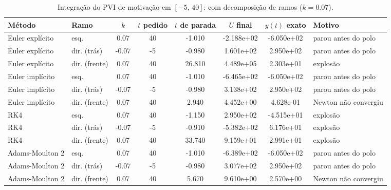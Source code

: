 \begin{table}[H]
    \centering
    \small
    \begin{tabular}{llcccccl}
        \hline
        Método & Ramo & $k$ & $t$ pedido & $t$ de parada & $U$ final & $y(t)$ exato & Motivo \\
        \hline
        Euler explícito & esq. & 0.07 & 40 & -1.010 & -2.188e+02 & -6.050e+02 & parou antes do polo \\
        Euler explícito & dir. (trás) & -0.07 & -5 & -0.980 & 1.601e+02 & 2.950e+02 & parou antes do polo \\
        Euler explícito & dir. (frente) & 0.07 & 40 & 26.810 & 4.489e+05 & 2.303e+01 & explosão \\
        Euler implícito & esq. & 0.07 & 40 & -1.010 & -6.465e+02 & -6.050e+02 & parou antes do polo \\
        Euler implícito & dir. (trás) & -0.07 & -5 & -0.980 & 3.138e+02 & 2.950e+02 & parou antes do polo \\
        Euler implícito & dir. (frente) & 0.07 & 40 & 2.940 & 4.452e+00 & 4.628e-01 & Newton não convergiu \\
        RK4 & esq. & 0.07 & 40 & -1.150 & 2.950e+02 & -4.515e+01 & explosão \\
        RK4 & dir. (trás) & -0.07 & -5 & -0.910 & -5.382e+02 & 6.176e+01 & explosão \\
        RK4 & dir. (frente) & 0.07 & 40 & 33.740 & 9.159e+01 & 2.991e+01 & explosão \\
        Adams-Moulton 2 & esq. & 0.07 & 40 & -1.010 & -6.389e+02 & -6.050e+02 & parou antes do polo \\
        Adams-Moulton 2 & dir. (trás) & -0.07 & -5 & -0.980 & 3.077e+02 & 2.950e+02 & parou antes do polo \\
        Adams-Moulton 2 & dir. (frente) & 0.07 & 40 & 5.670 & 9.610e+00 & 2.570e+00 & Newton não convergiu \\
        \hline
    \end{tabular}
    \caption{Integração do PVI de motivação em $[-5,\, 40]$: com decomposição de ramos ($k = 0.07$).}
    \label{tab:m5_40_cd_k07}
\end{table}
